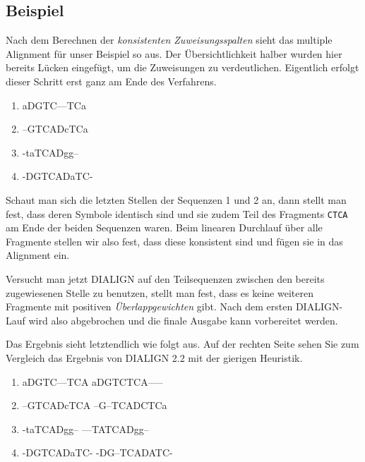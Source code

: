 \subsection{Beispiel}

Nach dem Berechnen der \emph{konsistenten Zuweisungsspalten} sieht das multiple Alignment für unser Beispiel so aus. Der Übersichtlichkeit halber wurden hier bereits Lücken eingefügt, um die Zuweisungen zu verdeutlichen. Eigentlich erfolgt dieser Schritt erst ganz am Ende des Verfahrens.

\ttfamily
\begin{enumerate}[topsep=0pt,itemsep=-1ex,partopsep=1ex,parsep=1ex]
	\item aDGTC---TCa
	\item --GTCADcTCa
	\item -taTCADgg--
	\item -DGTCADaTC-
\end{enumerate}
\normalfont

Schaut man sich die letzten Stellen der Sequenzen 1 und 2 an, dann stellt man fest, dass deren Symbole identisch sind und sie zudem Teil des Fragments \texttt{CTCA} am Ende der beiden Sequenzen waren. Beim linearen Durchlauf über alle Fragmente stellen wir also fest, dass diese konsistent sind und fügen sie in das Alignment ein.

Versucht man jetzt DIALIGN auf den Teilsequenzen zwischen den bereits zugewiesenen Stelle zu benutzen, stellt man fest, dass es keine weiteren Fragmente mit positiven \emph{Überlappgewichten} gibt. Nach dem ersten DIALIGN-Lauf wird also abgebrochen und die finale Ausgabe kann vorbereitet werden.

Das Ergebnis sieht letztendlich wie folgt aus. Auf der rechten Seite sehen Sie zum Vergleich das Ergebnis von DIALIGN 2.2 mit der gierigen Heuristik.

\ttfamily
\begin{enumerate}[topsep=0pt,itemsep=-1ex,partopsep=1ex,parsep=1ex]
	\item aDGTC---TCA \hspace{3cm} aDGTCTCA-----
	\item --GTCADcTCA \hspace{3cm} --G--TCADCTCa
	\item -taTCADgg-- \hspace{3cm} ---TATCADgg--
	\item -DGTCADaTC- \hspace{3cm} -DG--TCADATC-
\end{enumerate}
\normalfont

